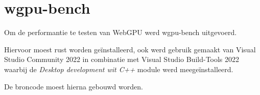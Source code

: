 


\section{wgpu-bench}

Om de performantie te testen van WebGPU werd wgpu-bench uitgevoerd.

Hiervoor moest rust worden geïnstalleerd, ook werd gebruik gemaakt van Visual Studio Community 2022 in combinatie met Visual Studio Build-Tools 2022 waarbij de \textit{Desktop development wit C++} module werd meegeïnstalleerd.

De broncode moest hierna gebouwd worden.

